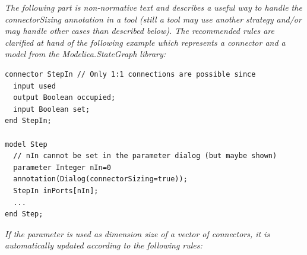 \documentclass[10pt,a4paper]{report}
\begin{document}

\emph{The following part is non-normative text and describes a useful
way to handle the connectorSizing annotation in a tool (still a tool may
use another strategy and/or may handle other cases than described
below). The recommended rules are clarified at hand of the following
example which represents a connector and a model from the
Modelica.StateGraph library:}

\begin{lstlisting}[language=modelica]
connector StepIn // Only 1:1 connections are possible since
  input used
  output Boolean occupied;
  input Boolean set;
end StepIn;

model Step
  // nIn cannot be set in the parameter dialog (but maybe shown)
  parameter Integer nIn=0
  annotation(Dialog(connectorSizing=true));
  StepIn inPorts[nIn];
  ...
end Step;
\end{lstlisting}
\emph{If the parameter is used as dimension size of a {vector of
connectors}, it is automatically updated according to the following
rules:}
\end{document}
